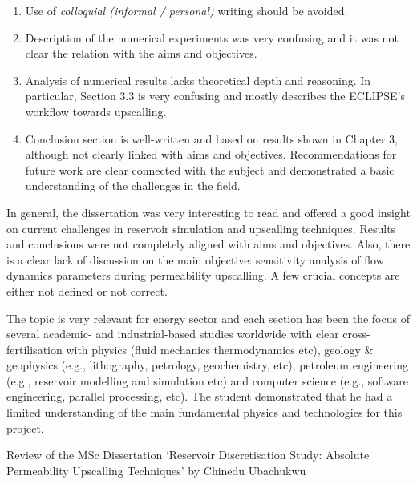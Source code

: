 \documentclass[14pt,twoside]{report}
\begin{document}
\begin{enumerate}
%
\item Use of {\it colloquial (informal / personal)} writing should be avoided. 
%
\item Description of the numerical experiments was very confusing and it was not clear the relation with the aims and objectives.
%
\item Analysis of numerical results lacks theoretical depth and reasoning. In particular, Section 3.3 is very confusing and mostly describes the ECLIPSE's workflow towards upscalling. 
%
\item Conclusion section is well-written and based on results shown in Chapter 3, although not clearly linked with aims and objectives. Recommendations for future work are clear connected with the subject and demonstrated a basic understanding of the challenges in the field. 
% 
\end{enumerate}

In general, the dissertation was very interesting to read and offered a good insight on current challenges in reservoir simulation and upscalling techniques. Results and conclusions were not completely aligned with aims and objectives. Also, there is a clear lack of discussion on the main objective: sensitivity analysis of flow dynamics parameters during permeability upscalling. A few crucial concepts are either not defined or not correct.

The topic is very relevant for energy sector and each section has been the focus of several academic- and industrial-based studies worldwide with clear cross-fertilisation with physics (fluid mechanics thermodynamics etc), geology $\&$ geophysics (e.g., lithography, petrology, geochemistry, etc), petroleum engineering (e.g., reservoir modelling and simulation etc) and computer science (e.g., software engineering, parallel processing, etc). The student demonstrated that he had a limited understanding of the main fundamental physics and technologies for this project.

\clearpage




\bigskip

\begin{center}
{\Large Review of the MSc Dissertation `Reservoir Discretisation Study: Absolute Permeability Upscalling Techniques' by Chinedu Ubachukwu}
\end{center}
\end{document}
